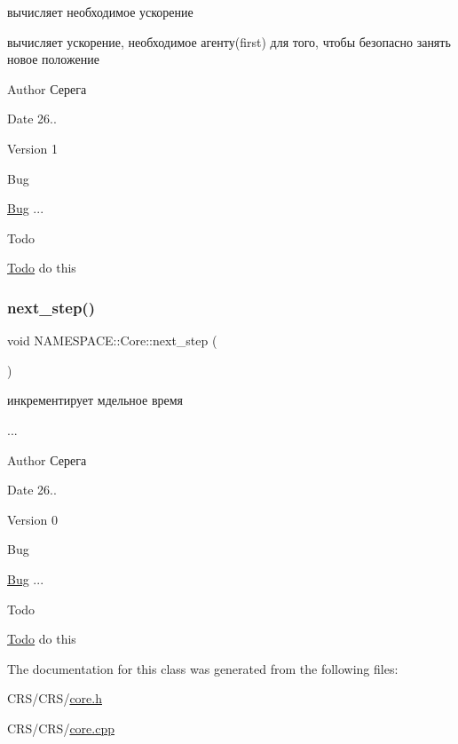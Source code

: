 вычисляет необходимое ускорение 

вычисляет ускорение, необходимое агенту(first) для того, чтобы безопасно занять новое положение \begin{DoxyAuthor}{Author}
Серега 
\end{DoxyAuthor}
\begin{DoxyDate}{Date}
26.. 
\end{DoxyDate}
\begin{DoxyVersion}{Version}
1 
\end{DoxyVersion}
\begin{DoxyRefDesc}{Bug}
\item[\hyperlink{bug__bug000002}{Bug}]... \end{DoxyRefDesc}
\begin{DoxyRefDesc}{Todo}
\item[\hyperlink{todo__todo000002}{Todo}]do this \end{DoxyRefDesc}
\mbox{\label{class_n_a_m_e_s_p_a_c_e_1_1_core_a20d789ad96c8c29ec3568fd48bfe616b}} 
\subsubsection{\texorpdfstring{next\+\_\+step()}{next\_step()}}
{\footnotesize\ttfamily void N\+A\+M\+E\+S\+P\+A\+C\+E\+::\+Core\+::next\+\_\+step (\begin{DoxyParamCaption}{ }\end{DoxyParamCaption})}

инкрементирует мдельное время

... \begin{DoxyAuthor}{Author}
Серега 
\end{DoxyAuthor}
\begin{DoxyDate}{Date}
26.. 
\end{DoxyDate}
\begin{DoxyVersion}{Version}
0 
\end{DoxyVersion}
\begin{DoxyRefDesc}{Bug}
\item[\hyperlink{bug__bug000003}{Bug}]... \end{DoxyRefDesc}
\begin{DoxyRefDesc}{Todo}
\item[\hyperlink{todo__todo000003}{Todo}]do this \end{DoxyRefDesc}


The documentation for this class was generated from the following files\+:\begin{DoxyCompactItemize}
\item 
C\+R\+S/\+C\+R\+S/\hyperlink{core_8h}{core.\+h}\item 
C\+R\+S/\+C\+R\+S/\hyperlink{core_8cpp}{core.\+cpp}\end{DoxyCompactItemize}

